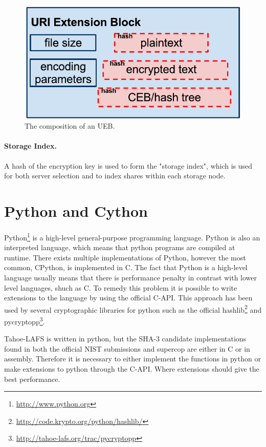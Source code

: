 \documentclass[english,12pt,a4paper]{book}
\begin{document}
\begin{figure}[!h]
    \centering
    \includegraphics[width=0.9\columnwidth]{Tahoe-UEB.pdf}
    \caption{The composition of an \ac{UEB}.}
    \label{fig:tahoeueb}
\end{figure}

\paragraph{Storage Index.}

A hash of the encryption key is used to form the "storage index", which is
used for both server selection and to index shares within each storage node.

\section{Python and Cython}
Python\footnote{\url{http://www.python.org}} is a high-level general-purpose
programming language. Python is also an interpreted language, which means that
python programs are compiled at runtime.  There exists multiple implementations
of Python, however the most common, CPython, is implemented in C. The fact that
Python is a high-level language usually means that there is performance penalty
in contrast with lower level languages, shuch as C. To remedy this problem it
is possible to write extensions to the language by using the official C-API.
This approach has been used by several cryptographic libraries for python such
as the official hashlib\footnote{\url{http://code.krypto.org/python/hashlib/}}
and pycryptopp\footnote{\url{http://tahoe-lafs.org/trac/pycryptopp}}.

Tahoe-\ac{LAFS} is written in python, but the SHA-3 candidate implementations found
in both the official NIST submissions and supercop are either in C or in
assembly. Therefore it is necessary to either implement the functions in python
or make extensions to python through the C-API. Where extensions should give
the best performance. %
\end{document}
